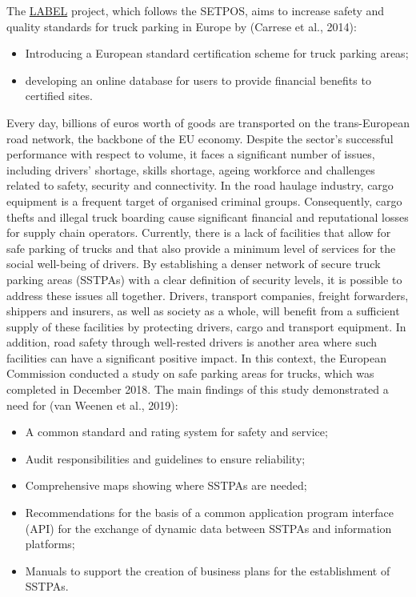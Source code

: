 \documentclass[
]{book}
\providecommand{\tightlist}{%
  \setlength{\itemsep}{0pt}\setlength{\parskip}{0pt}}
\begin{document}
The \href{https://ec.europa.eu/transport/sites/transport/files/modes/road/parking/doc/handbook_for_labelling.pdf}{LABEL} project, which follows the SETPOS, aims to increase safety and quality standards for truck parking in Europe by (Carrese et al., 2014):

\begin{itemize}
\tightlist
\item
  Introducing a European standard certification scheme for truck parking areas;
\item
  developing an online database for users to provide financial benefits to certified sites.
\end{itemize}

Every day, billions of euros worth of goods are transported on the trans-European road network, the backbone of the EU economy. Despite the sector's successful performance with respect to volume, it faces a significant number of issues, including drivers' shortage, skills shortage, ageing workforce and challenges related to safety, security and connectivity. In the road haulage industry, cargo equipment is a frequent target of organised criminal groups. Consequently, cargo thefts and illegal truck boarding cause significant financial and reputational losses for supply chain operators.
Currently, there is a lack of facilities that allow for safe parking of trucks and that also provide a minimum level of services for the social well-being of drivers. By establishing a denser network of secure truck parking areas (SSTPAs) with a clear definition of security levels, it is possible to address these issues all together. Drivers, transport companies, freight forwarders, shippers and insurers, as well as society as a whole, will benefit from a sufficient supply of these facilities by protecting drivers, cargo and transport equipment. In addition, road safety through well-rested drivers is another area where such facilities can have a significant positive impact. In this context, the European Commission conducted a study on safe parking areas for trucks, which was completed in December 2018. The main findings of this study demonstrated a need for (van Weenen et al., 2019):

\begin{itemize}
\tightlist
\item
  A common standard and rating system for safety and service;
\item
  Audit responsibilities and guidelines to ensure reliability;
\item
  Comprehensive maps showing where SSTPAs are needed;
\item
  Recommendations for the basis of a common application program interface (API) for the exchange of dynamic data between SSTPAs and information platforms;
\item
  Manuals to support the creation of business plans for the establishment of SSTPAs.
\end{itemize}
\end{document}
